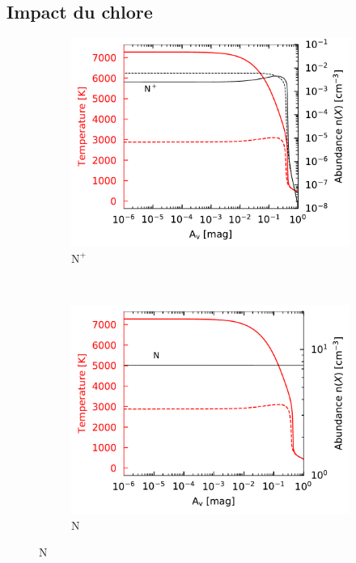 \begin{appendices}




\section{Impact du chlore} 
\label{appendix:chlore}

\begin{figure}[!htbp]
    \centering
    \begin{subfigure}[t]{0.49\textwidth} %
        \centering \includegraphics[trim = {0 0 0 0},clip,width=1\textwidth]{figure/Cl/gridModelEmiss/nT_comp_Np.pdf}
        \caption{$\mathrm{N}^+$}
    \end{subfigure}
    ~ 
   \begin{subfigure}[t]{0.49\textwidth} %
        \centering \includegraphics[trim = {0 0 0 0},clip,width=1\textwidth]{figure/Cl/gridModelEmiss/nT_comp_N.pdf}
        \caption{$\mathrm{N}$}
    \end{subfigure}
    

\end{figure}
\end{appendices}

